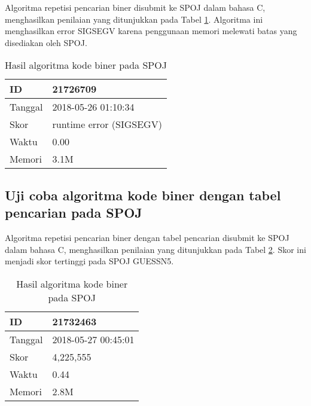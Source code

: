 Algoritma repetisi pencarian biner disubmit ke SPOJ dalam bahasa C, menghasilkan penilaian yang ditunjukkan pada Tabel \ref{tab:score_brute_binary_code}. Algoritma ini menghasilkan error SIGSEGV karena penggunaan memori melewati batas yang disediakan oleh SPOJ.

\begin{table}[h!]
\caption{Hasil algoritma kode biner pada SPOJ}
\label{tab:score_brute_binary_code}
\begin{center}
\begin{tabular} {|l|l|}
\hline
ID & 21726709 \\ \hline
Tanggal & 2018-05-26 01:10:34 \\ \hline
Skor & runtime error (SIGSEGV) \\ \hline
Waktu & 0.00 \\ \hline
Memori & 3.1M \\ \hline
\end{tabular}
\end{center}
\end{table}

\subsection{Uji coba algoritma kode biner dengan tabel pencarian pada SPOJ}

Algoritma repetisi pencarian biner dengan tabel pencarian disubmit ke SPOJ dalam bahasa C, menghasilkan penilaian yang ditunjukkan pada Tabel \ref{tab:score_binary_code}. Skor ini menjadi skor tertinggi pada SPOJ GUESSN5.

\begin{table}[h!]
\caption{Hasil algoritma kode biner pada SPOJ}
\label{tab:score_binary_code}
\begin{center}
\begin{tabular} {|l|l|}
\hline
ID & 21732463 \\ \hline
Tanggal & 2018-05-27 00:45:01 \\ \hline
Skor & 4,225,555 \\ \hline
Waktu & 0.44 \\ \hline
Memori & 2.8M \\ \hline
\end{tabular}
\end{center}
\end{table}
